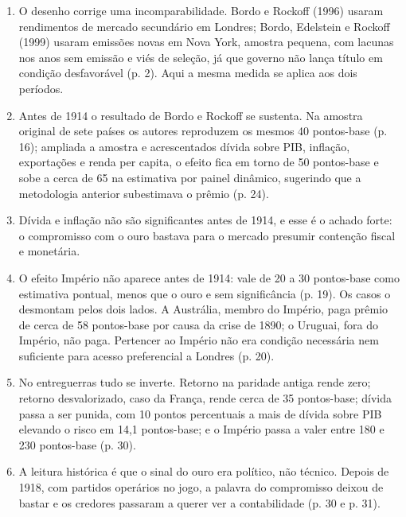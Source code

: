 \begin{enumerate}[leftmargin=*,nosep]
\item O desenho corrige uma incomparabilidade. Bordo e Rockoff (1996) usaram
rendimentos de mercado secundário em Londres; Bordo, Edelstein e Rockoff (1999)
usaram emissões novas em Nova York, amostra pequena, com lacunas nos anos sem
emissão e viés de seleção, já que governo não lança título em condição
desfavorável (p. 2). Aqui a mesma medida se aplica aos dois períodos.

\item Antes de 1914 o resultado de Bordo e Rockoff se sustenta. Na amostra
original de sete países os autores reproduzem os mesmos 40 pontos-base (p. 16);
ampliada a amostra e acrescentados dívida sobre PIB, inflação, exportações e
renda per capita, o efeito fica em torno de 50 pontos-base e sobe a cerca de 65
na estimativa por painel dinâmico, sugerindo que a metodologia anterior
subestimava o prêmio (p. 24).

\item Dívida e inflação não são significantes antes de 1914, e esse é o achado
forte: o compromisso com o ouro bastava para o mercado presumir contenção
fiscal e monetária.


\item O efeito Império não aparece antes de 1914: vale de 20 a 30 pontos-base
como estimativa pontual, menos que o ouro e sem significância (p. 19). Os casos
o desmontam pelos dois lados. A Austrália, membro do Império, paga prêmio de
cerca de 58 pontos-base por causa da crise de 1890; o Uruguai, fora do Império,
não paga. Pertencer ao Império não era condição necessária nem suficiente para
acesso preferencial a Londres (p. 20).

\item No entreguerras tudo se inverte. Retorno na paridade antiga rende zero;
retorno desvalorizado, caso da França, rende cerca de 35 pontos-base; dívida
passa a ser punida, com 10 pontos percentuais a mais de dívida sobre PIB
elevando o risco em 14,1 pontos-base; e o Império passa a valer entre 180 e 230
pontos-base (p. 30).


\item A leitura histórica é que o sinal do ouro era político, não técnico.
Depois de 1918, com partidos operários no jogo, a palavra do compromisso deixou
de bastar e os credores passaram a querer ver a contabilidade (p. 30 e p. 31).
\end{enumerate}

